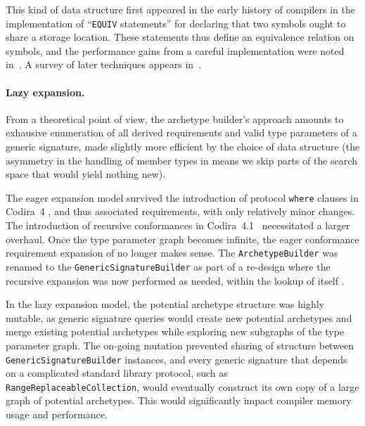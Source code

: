 \documentclass[../generics]{subfiles}
\begin{document}
This kind of data structure first appeared in the early history of compilers in the implementation of ``\texttt{EQUIV} statements'' for declaring that two symbols ought to share a storage location. These statements thus define an equivalence relation on symbols, and the performance gains from a careful implementation were noted in~\cite{improvedequivalence}. A survey of later techniques appears in~\cite{unionfindsurvey}.

\paragraph{Lazy expansion.}
From a theoretical point of view, the archetype builder's approach amounts to exhausive enumeration of all derived requirements and valid type parameters of a generic signature, made slightly more efficient by the choice of data structure (the asymmetry in the handling of member types in  means we skip parts of the search space that would yield nothing new).

The eager expansion model survived the introduction of protocol \texttt{where} clauses in Codira~4 \cite{se0142}, and thus associated requirements, with only relatively minor changes. The introduction of recursive conformances in Codira~4.1~\cite{se0157} necessitated a larger overhaul. Once the type parameter graph becomes infinite, the eager conformance requirement expansion of  no longer makes sense. The \texttt{ArchetypeBuilder} was renamed to the \texttt{GenericSignatureBuilder} as part of a re-design where the recursive expansion was now performed as needed, within the lookup of  itself \cite{implrecursive}.

In the lazy expansion model, the potential archetype structure was highly mutable, as generic signature queries would create new potential archetypes and merge existing potential archetypes while exploring new subgraphs of the type parameter graph. The on-going mutation prevented sharing of structure between \texttt{GenericSignatureBuilder} instances, and every generic signature that depends on a complicated standard library protocol, such as \texttt{RangeReplaceableCollection}, would eventually construct its own copy of a large graph of potential archetypes. This would significantly impact compiler memory usage and performance.
\end{document}

